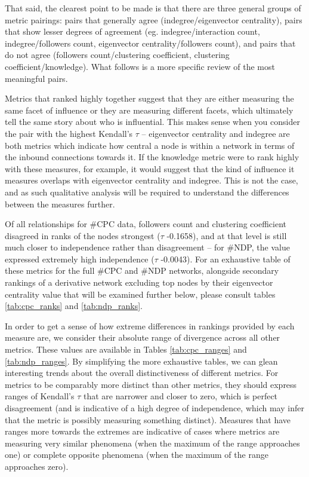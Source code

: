 \documentclass[a4paper,12pt]{article}
\begin{document}
That said, the clearest point to be made is that there are three general groups of metric pairings: pairs that generally agree (indegree/eigenvector centrality), pairs that show lesser degrees of agreement (eg. indegree/interaction count, indegree/followers count, eigenvector centrality/followers count), and pairs that do not agree (followers count/clustering coefficient, clustering coefficient/knowledge). What follows is a more specific review of the most meaningful pairs.

Metrics that ranked highly together suggest that they are either measuring the same facet of influence or they are measuring different facets, which ultimately tell the same story about who is influential. This makes sense when you consider the pair with the highest Kendall's $\tau$ --  eigenvector centrality and indegree are both metrics which indicate how central a node is within a network in terms of the inbound connections towards it. If the knowledge metric were to rank highly with these measures, for example, it would suggest that the kind of influence it measures overlaps with eigenvector centrality and indegree. This is not the case, and as such qualitative analysis will be required to understand the differences between the measures further. 

Of all relationships for \#CPC data, followers count and clustering coefficient disagreed in ranks of the nodes strongest ($\tau$ -0.1658), and at that level is still much closer to independence rather than disagreement -- for \#NDP, the value expressed extremely high independence ($\tau$ -0.0043). For an exhaustive table of these metrics for the full \#CPC and \#NDP networks, alongside secondary rankings of a derivative network excluding top nodes by their eigenvector centrality value that will be examined further below, please consult tables \ref{tab:cpc_ranks} and \ref{tab:ndp_ranks}.

In order to get a sense of how extreme differences in rankings provided by each measure are, we consider their absolute range of divergence across all other metrics. These values are available in Tables \ref{tab:cpc_ranges} and \ref{tab:ndp_ranges}. By simplifying the more exhaustive tables, we can glean interesting trends about the overall distinctiveness of different metrics. For metrics to be comparably more distinct than other metrics, they should express ranges of Kendall's $\tau$ that are narrower and closer to zero, which is perfect disagreement (and is indicative of a high degree of independence, which may infer that the metric is possibly measuring something distinct). Measures that have ranges more towards the extremes are indicative of cases where metrics are measuring very similar phenomena (when the maximum of the range approaches one) or complete opposite phenomena (when the maximum of the range approaches zero). 
\end{document}
